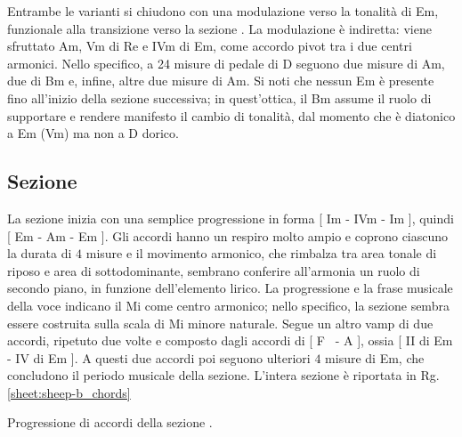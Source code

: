 \documentclass[class=book, crop=false, oneside, 12pt]{standalone}
\begin{document}
    Entrambe le varianti si chiudono con una modulazione verso la tonalità di Em, funzionale alla transizione verso la sezione . La modulazione è indiretta: viene sfruttato Am, Vm di Re e IVm di Em,  come accordo pivot tra i due centri armonici. Nello specifico, a 24 misure di pedale di D seguono due misure di Am, due di Bm e, infine, altre due misure di Am. Si noti che nessun Em è presente fino all'inizio della sezione successiva; in quest'ottica,  il Bm assume il ruolo di supportare e rendere manifesto il cambio di tonalità, dal momento che è diatonico a Em (Vm) ma non a D dorico. 

    \subsection{Sezione }
    La sezione  inizia con una semplice progressione in forma [ Im - IVm - Im ], quindi [ Em - Am - Em ]. Gli accordi hanno un respiro molto ampio e coprono ciascuno la durata di \(4\) misure e il movimento armonico, che rimbalza tra area tonale di riposo e area di sottodominante, sembrano conferire all'armonia un ruolo di secondo piano, in funzione dell'elemento lirico. La progressione e la frase musicale della voce indicano il Mi come centro armonico; nello specifico, la sezione sembra essere costruita sulla scala di Mi minore naturale.
    Segue un altro vamp di due accordi, ripetuto due volte e composto dagli accordi di [ F\sharp~ - A ], ossia [ II di Em - IV di Em ].  A questi due accordi poi seguono ulteriori \(4\) misure di Em, che concludono il periodo musicale della sezione. L'intera sezione è riportata in Rg.\ref{sheet:sheep-b_chords}

    \begin{sheet}[htb]
        \centering
        \caption{Progressione di accordi della sezione .}
        \label{sheet:sheep-b_chords}
    \end{sheet}
    
\end{document}
